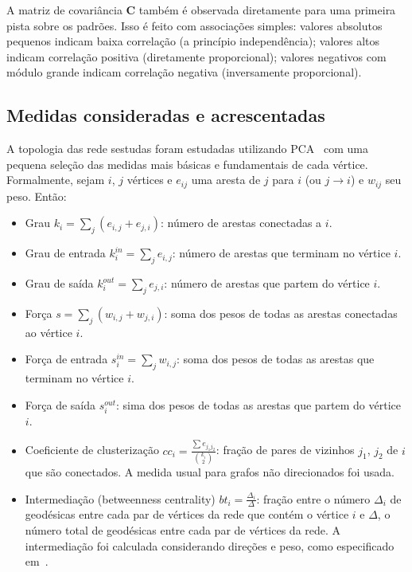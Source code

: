 \documentclass[a4paper,openright,12pt]{report} %
\begin{document}
A matriz de covariância $\mathbf{C}$ também é observada diretamente para
uma primeira pista sobre os padrões. Isso é feito com associações simples: valores absolutos pequenos indicam baixa correlação (a princípio independência); valores altos indicam correlação positiva (diretamente proporcional);
valores negativos com módulo grande indicam correlação negativa (inversamente proporcional).

\subsection{Medidas consideradas e acrescentadas}\label{sec:med}
A topologia das rede sestudas foram estudadas utilizando PCA~\cite{pca}
com uma pequena seleção das medidas mais básicas e fundamentais de cada vértice. Formalmente, sejam $i$, $j$ vértices e $e_{ij}$ uma aresta de $j$ para $i$ (ou $j\rightarrow i$) e $w_{ij}$ seu peso. Então:

\begin{itemize}
	\item Grau $k_i=\sum_j (e_{i,j}+e_{j,i})$: número de arestas conectadas a $i$.
	\item Grau de entrada $k_i^{in}=\sum_j e_{i,j}$: número de arestas que terminam no vértice $i$.
	\item Grau de saída $k_i^{out}=\sum_j e_{j,i}$: número de arestas que partem do vértice $i$.
	\item Força $s=\sum_j (w_{i,j}+w_{j,i})$: soma dos pesos de todas as arestas conectadas ao vértice $i$.
	\item Força de entrada $s_i^{in}=\sum_j w_{i,j}$: soma dos pesos de todas as arestas que terminam no vértice $i$.
	\item Força de saída $s_i^{out}$: sima dos pesos de todas as arestas que partem do vértice $i$.
	\item Coeficiente de clusterização $cc_i=\frac{\sum e_{j_1 j_2}}{\binom{k_i}{2}}$: fração de pares de vizinhos $j_1$, $j_2$ de $i$ que são conectados. A medida usual para grafos não direcionados foi usada.
\item Intermediação (betweenness centrality) $bt_i=\frac{\Delta_i}{\Delta}$: fração entre o número $\Delta_i$ de geodésicas entre cada par de vértices da rede que contém o vértice $i$ e $\Delta$, o número total de geodésicas entre cada par de vértices da rede.
	A intermediação foi calculada considerando direções e peso, como especificado em~\cite{faster}.
\end{itemize}
\end{document}
